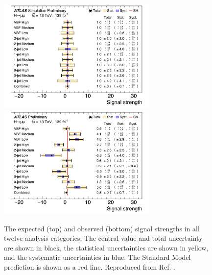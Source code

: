 \begin{figure}[h!]
  \centering
  \includegraphics[width=0.7\textwidth]{figures/hmumu/STXS_exp}
  \includegraphics[width=0.7\textwidth]{figures/hmumu/STXS_obser}
  \caption[Expected and observed signal strengths in analysis categories]{
  The expected (top) and observed (bottom) signal strengths in all twelve
  analysis categories. The central value and total uncertainty are shown 
  in black, the statistical uncertainties are shown in yellow, and the
  systematic uncertainties in blue. The Standard Model prediction
  is shown as a red line.
  Reproduced from Ref. \cite{ATLAS-CONF-2019-028}.
  }
  \label{fig:hmumu:fit-pulls}
\end{figure}







